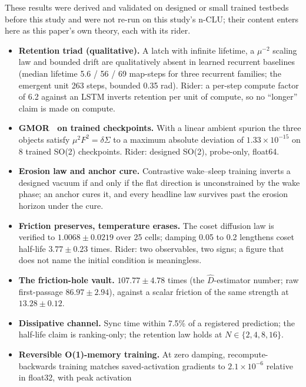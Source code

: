 \documentclass{article} %
\newcommand{\sci}[2]{\ensuremath{#1\times10^{#2}}}
\begin{document}
These results were derived and validated on designed or small trained testbeds before this study
and were not re-run on this study's n-CLU; their content enters here as this paper's own theory,
each with its rider. %
\begin{itemize}
\item \textbf{Retention triad (qualitative).} A latch with infinite lifetime, a $\mu^{-2}$ scaling
law and bounded drift are qualitatively absent in learned recurrent baselines (median lifetime 5.6
  / 56 / 69 map-steps for three recurrent families; the emergent unit 263 steps, bounded 0.35 rad).
  Rider: a per-step compute factor of 6.2 against an LSTM inverts retention per unit of compute, so
  no ``longer'' claim is made on compute. %
\item \textbf{GMOR~\citep{gell-mann_behavior_1968} on trained checkpoints.} With a linear ambient spurion the three objects satisfy
  $\mu^2F^2=\delta\Sigma$ to a maximum absolute deviation of \sci{1.33}{-15} on 8 trained SO(2)
  checkpoints. Rider: designed SO(2), probe-only, float64. %
\item \textbf{Erosion law and anchor cure.} Contrastive wake--sleep training inverts a designed
  vacuum if and only if the flat direction is unconstrained by the wake phase; an anchor cures it,
  and every headline law survives past the erosion horizon under the cure. %
\item \textbf{Friction preserves, temperature erases.} The coset diffusion law is verified to
  $1.0068\pm0.0219$ over 25 cells; damping 0.05 to 0.2 lengthens coset half-life
  $3.77\pm0.23$ times. Rider: two observables, two signs; a figure that does not name the initial
  condition is meaningless. %
\item \textbf{The friction-hole vault.} $107.77\pm4.78$ times (the $\hat D$-estimator number; raw
  first-passage $86.97\pm2.94$), against a scalar friction of the same strength at
  $13.28\pm0.12$. %
\item \textbf{Dissipative channel.} Sync time within 7.5\% of a registered prediction; the half-life
  claim is ranking-only; the retention law holds at $N\in\{2,4,8,16\}$. %
\item \textbf{Reversible O(1)-memory training.} At zero damping, recompute-backwards training
  matches saved-activation gradients to \sci{2.1}{-6} relative in float32, with peak activation

\end{itemize}
\end{document}
